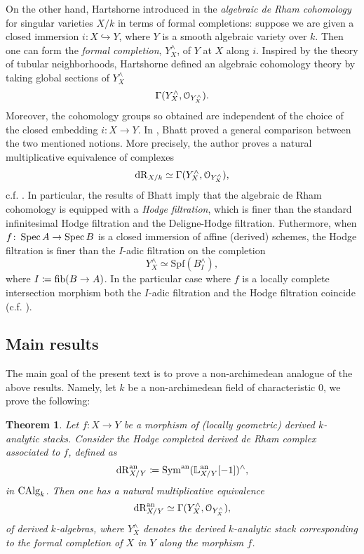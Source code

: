 \documentclass[10pt,a4paper,reqno]{amsart} %
\theoremstyle{plain}
\newtheorem{thm}{Theorem}[section]
\theoremstyle{definition}
\theoremstyle{remark}
\numberwithin{equation}{section}
\begin{document}
On the other hand, Hartshorne introduced in \cite{hartshorne1975rham} the \emph{algebraic de Rham cohomology} for singular varieties
$X/ k$ in terms
of formal completions: suppose we are given a closed immersion
$i \colon X \hookrightarrow Y$, where $Y$ is a smooth algebraic variety over $k$. Then one can form the \emph{formal completion}, $Y^\wedge_X$, of $Y$ at $X$ along $i$. Inspired by the theory of tubular neighborhoods, Hartshorne defined an algebraic cohomology theory
by taking global sections of $Y_X^\wedge$
    \[
        \Gamma(Y^\wedge_X, \mathcal O_{Y^\wedge_X}).    
    \]
Moreover, the cohomology groups so obtained are independent of the choice of the closed embedding $i \colon  X\to Y$.
In \cite{Bhatt_Derived_Completions},
Bhatt proved a general comparison between the two mentioned notions. More precisely, the author proves a natural multiplicative
equivalence of complexes
    \[
        \mathrm{dR}_{X/k} \simeq  \Gamma(Y^\wedge_X, \mathcal O_{Y^\wedge_X}),
    \]
c.f. \cite[Proposition 4.16]{Bhatt_Derived_Completions}.
In particular, the results of Bhatt imply that
the algebraic de Rham cohomology is equipped with a \emph{Hodge filtration}, which is finer than the standard infinitesimal Hodge filtration
and the Deligne-Hodge filtration.
Futhermore, when $f \colon \operatorname{Spec} A \to \operatorname{Spec} B$ is a closed immersion of affine (derived) schemes, the Hodge filtration
is finer than the $I$-adic filtration on the completion 
    \[
        Y^\wedge_X \simeq \mathrm{Spf} (B^\wedge_I),
    \]
where $I \coloneqq \mathrm{fib}(B \to A)$.
In the particular case where $f$ is a locally complete intersection morphism both the $I$-adic filtration
and the Hodge filtration coincide (c.f. \cite[Remark 4.13]{Bhatt_Derived_Completions}).

\subsection{Main results}
The main goal of the present text is to prove a non-archimedean analogue of the above results. Namely, let $k$ be a non-archimedean field of characteristic $0$,
we prove the following:

\begin{thm} \label{intro-thm1}
    Let $f \colon X \to Y$ be a morphism of (locally geometric) derived $k$-analytic stacks. Consider
    the \emph{Hodge completed derived de Rham complex associated to $f$}, defined as 
        \[\mathrm{dR}_{X/ Y} ^\mathrm{an} \coloneqq \operatorname{Sym}^\mathrm{an}(\mathbb L_{X/ Y} ^\mathrm{an}[-1])^\wedge,\]
    in $\mathrm{CAlg}_k$.
    Then one has a natural multiplicative equivalence
        \[
            \mathrm{dR}_{X/ Y} ^\mathrm{an} \simeq \Gamma(Y^\wedge_X, \mathcal O_{Y^\wedge_X}),
        \]
    of derived $k$-algebras,
    where $Y^\wedge_X$ denotes the derived $k$-analytic stack corresponding to the formal completion of $X$ in $Y$ along the morphism $f$.
\end{thm}
\end{document}
